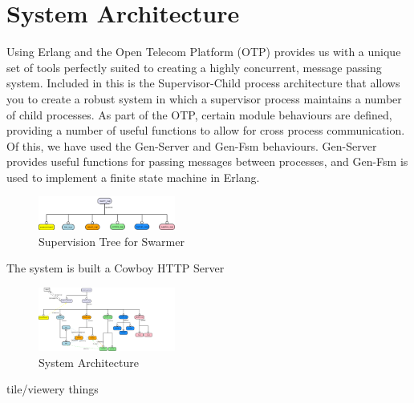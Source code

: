 \documentclass[10pt, a4paper, conference, compsocconf]{IEEEtran}
\begin{document}
\section{System Architecture \label{architecture}}

Using Erlang and the Open Telecom Platform\cite{otp} (OTP) provides us with a unique set of tools perfectly suited to creating a highly concurrent, message passing system. Included in this is the Supervisor-Child process architecture that allows you to create a robust system in which a supervisor process maintains a number of child processes. As part of the OTP, certain module behaviours are defined, providing a number of useful functions to allow for cross process communication. Of this, we have used the Gen-Server and Gen-Fsm behaviours. Gen-Server provides useful functions for passing messages between processes, and Gen-Fsm is used to implement a finite state machine in Erlang.

\begin{figure}[h]
  \centering
  \includegraphics[width=0.4\textwidth]{../img/supervisor.png}
\caption{Supervision Tree for Swarmer}
    \label{fig:sup_tree}
\end{figure}

The system is built a Cowboy HTTP Server

\begin{figure}[h]
  \centering
  \includegraphics[width=0.4\textwidth]{../img/final_system_ws.png}
\caption{System Architecture}
    \label{fig:system_ws}
\end{figure}

tile/viewery things

\end{document}
